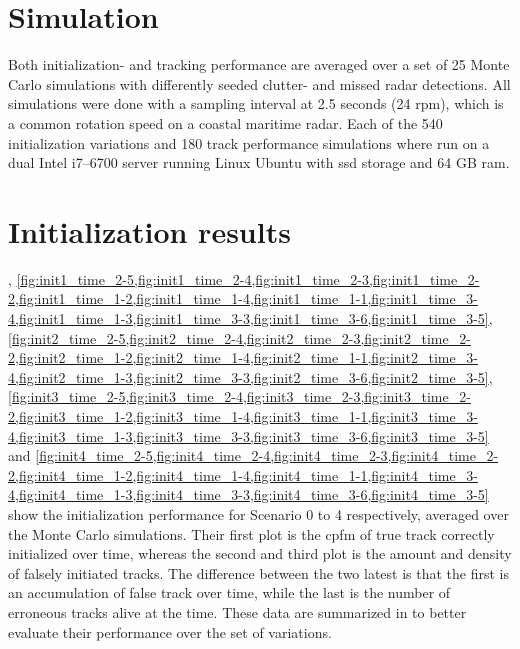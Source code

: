 \section{Simulation}
Both initialization- and tracking performance are averaged over a set of 25 Monte Carlo simulations with differently seeded clutter- and missed radar detections. All simulations were done with a sampling interval at 2.5 seconds (24 \gls{rpm}), which is a common rotation speed on a coastal maritime radar. Each of the 540 initialization variations and 180 track performance simulations where run on a dual Intel i7--6700 server running Linux Ubuntu with \gls{ssd} storage and 64 GB \gls{ram}.

\section{Initialization results}
, \cref{fig:init1_time_2-5,fig:init1_time_2-4,fig:init1_time_2-3,fig:init1_time_2-2,fig:init1_time_1-2,fig:init1_time_1-4,fig:init1_time_1-1,fig:init1_time_3-4,fig:init1_time_1-3,fig:init1_time_3-3,fig:init1_time_3-6,fig:init1_time_3-5}, \cref{fig:init2_time_2-5,fig:init2_time_2-4,fig:init2_time_2-3,fig:init2_time_2-2,fig:init2_time_1-2,fig:init2_time_1-4,fig:init2_time_1-1,fig:init2_time_3-4,fig:init2_time_1-3,fig:init2_time_3-3,fig:init2_time_3-6,fig:init2_time_3-5}, \cref{fig:init3_time_2-5,fig:init3_time_2-4,fig:init3_time_2-3,fig:init3_time_2-2,fig:init3_time_1-2,fig:init3_time_1-4,fig:init3_time_1-1,fig:init3_time_3-4,fig:init3_time_1-3,fig:init3_time_3-3,fig:init3_time_3-6,fig:init3_time_3-5} and \cref{fig:init4_time_2-5,fig:init4_time_2-4,fig:init4_time_2-3,fig:init4_time_2-2,fig:init4_time_1-2,fig:init4_time_1-4,fig:init4_time_1-1,fig:init4_time_3-4,fig:init4_time_1-3,fig:init4_time_3-3,fig:init4_time_3-6,fig:init4_time_3-5} show the initialization performance for Scenario 0 to 4 respectively, averaged over the Monte Carlo simulations. Their first plot is the \gls{cpfm} of true track correctly initialized over time, whereas the second and third plot is the amount and density of falsely initiated tracks. The difference between the two latest is that the first is an accumulation of false track over time, while the last is the number of erroneous tracks alive at the time. These data are summarized in  to better evaluate their performance over the set of variations. 

